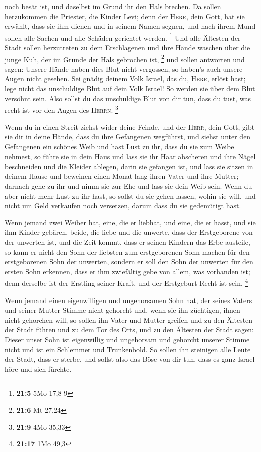 noch besät ist, und daselbst im Grund ihr den Hals brechen.
 Da sollen herzukommen die Priester, die Kinder Levi; denn
der \textsc{Herr}, dein Gott, hat sie erwählt, dass sie ihm dienen und
in seinem Namen segnen, und nach ihrem Mund sollen alle Sachen und alle
Schäden gerichtet werden. \footnote{\textbf{21:5} 5Mo 17,8-9}
 Und alle Ältesten der Stadt sollen herzutreten zu dem
Erschlagenen und ihre Hände waschen über die junge Kuh, der im Grunde
der Hals gebrochen ist, \footnote{\textbf{21:6} Mt 27,24} 
und sollen antworten und sagen: Unsere Hände haben dies Blut nicht
vergossen, so haben's auch unsere Augen nicht gesehen. 
Sei gnädig deinem Volk Israel, das du, \textsc{Herr}, erlöst hast; lege
nicht das unschuldige Blut auf dein Volk Israel! So werden sie über dem
Blut versöhnt sein.  Also sollst du das unschuldige Blut
von dir tun, dass du tust, was recht ist vor den Augen des
\textsc{Herrn}. \footnote{\textbf{21:9} 4Mo 35,33}

 Wenn du in einen Streit ziehst wider deine Feinde, und
der \textsc{Herr}, dein Gott, gibt sie dir in deine Hände, dass du ihre
Gefangenen wegführst,  und siehst unter den Gefangenen
ein schönes Weib und hast Lust zu ihr, dass du sie zum Weibe nehmest,
 so führe sie in dein Haus und lass sie ihr Haar
abscheren und ihre Nägel beschneiden  und die Kleider
ablegen, darin sie gefangen ist, und lass sie sitzen in deinem Hause und
beweinen einen Monat lang ihren Vater und ihre Mutter; darnach gehe zu
ihr und nimm sie zur Ehe und lass sie dein Weib sein. 
Wenn du aber nicht mehr Lust zu ihr hast, so sollst du sie gehen lassen,
wohin sie will, und nicht um Geld verkaufen noch versetzen, darum dass
du sie gedemütigt hast.

 Wenn jemand zwei Weiber hat, eine, die er liebhat, und
eine, die er hasst, und sie ihm Kinder gebären, beide, die liebe und die
unwerte, dass der Erstgeborene von der unwerten ist,  und
die Zeit kommt, dass er seinen Kindern das Erbe austeile, so kann er
nicht den Sohn der liebsten zum erstgeborenen Sohn machen für den
erstgeborenen Sohn der unwerten,  sondern er soll den
Sohn der unwerten für den ersten Sohn erkennen, dass er ihm zwiefältig
gebe von allem, was vorhanden ist; denn derselbe ist der Erstling seiner
Kraft, und der Erstgeburt Recht ist sein. \footnote{\textbf{21:17} 1Mo
  49,3}

 Wenn jemand einen eigenwilligen und ungehorsamen Sohn
hat, der seines Vaters und seiner Mutter Stimme nicht gehorcht und, wenn
sie ihn züchtigen, ihnen nicht gehorchen will,  so sollen
ihn Vater und Mutter greifen und zu den Ältesten der Stadt führen und zu
dem Tor des Orts,  und zu den Ältesten der Stadt sagen:
Dieser unser Sohn ist eigenwillig und ungehorsam und gehorcht unserer
Stimme nicht und ist ein Schlemmer und Trunkenbold.  So
sollen ihn steinigen alle Leute der Stadt, dass er sterbe, und sollst
also das Böse von dir tun, dass es ganz Israel höre und sich fürchte.

